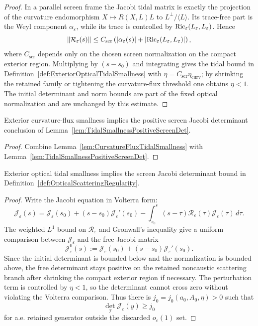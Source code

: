 \begin{proof}
In a parallel screen frame the Jacobi tidal matrix is exactly the projection of the curvature endomorphism $X\mapsto R(X,L)L$ to $L^\perp/\langle L\rangle$. Its trace-free part is the Weyl component $\alpha_\varepsilon$, while its trace is controlled by $\mathrm{Ric}_\varepsilon(L_\varepsilon,L_\varepsilon)$. Hence
\[
    \|\mathcal R_\varepsilon(s)\|
    \le C_{\mathrm{scr}}
    \left(
        |\alpha_\varepsilon(s)|
        +|\mathrm{Ric}_\varepsilon(L_\varepsilon,L_\varepsilon)|
    \right),
\]
where $C_{\mathrm{scr}}$ depends only on the chosen screen normalization on the compact exterior region. Multiplying by $(s-s_0)$ and integrating gives the tidal bound in Definition~\ref{def:ExteriorOpticalTidalSmallness} with $\eta=C_{\mathrm{scr}}\eta_{\mathrm{curv}}$; by shrinking the retained family or tightening the curvature-flux threshold one obtains $\eta<1$. The initial determinant and norm bounds are part of the fixed optical normalization and are unchanged by this estimate.
\end{proof}

\begin{corollary}\label{cor:CurvatureFluxPositiveScreenDet}
Exterior curvature-flux smallness implies the positive screen Jacobi determinant conclusion of Lemma~\ref{lem:TidalSmallnessPositiveScreenDet}.
\end{corollary}

\begin{proof}
Combine Lemma~\ref{lem:CurvatureFluxTidalSmallness} with Lemma~\ref{lem:TidalSmallnessPositiveScreenDet}.
\end{proof}

\begin{lemma}\label{lem:TidalSmallnessPositiveScreenDet}
Exterior optical tidal smallness implies the screen Jacobi determinant bound in Definition~\ref{def:OpticalScatteringRegularity}.
\end{lemma}

\begin{proof}
Write the Jacobi equation in Volterra form:
\[
    \mathcal J_\varepsilon(s)
    =
    \mathcal J_\varepsilon(s_0)
    +(s-s_0)\mathcal J_\varepsilon'(s_0)
    -
    \int_{s_0}^{s}(s-\tau)\mathcal R_\varepsilon(\tau)\mathcal J_\varepsilon(\tau)\,d\tau .
\]
The weighted $L^1$ bound on $\mathcal R_\varepsilon$ and Gronwall's inequality give a uniform comparison between $\mathcal J_\varepsilon$ and the free Jacobi matrix
\[
    \mathcal J_\varepsilon^{0}(s)
    :=
    \mathcal J_\varepsilon(s_0)+(s-s_0)\mathcal J_\varepsilon'(s_0).
\]
Since the initial determinant is bounded below and the normalization is bounded above, the free determinant stays positive on the retained noncaustic scattering branch after shrinking the compact exterior region if necessary. The perturbation term is controlled by $\eta<1$, so the determinant cannot cross zero without violating the Volterra comparison. Thus there is $j_0=j_0(a_0,A_0,\eta)>0$ such that
\[
    \det_{\mathscr I}\mathcal J_\varepsilon(y)\ge j_0
\]
for a.e. retained generator outside the discarded $o_\varepsilon(1)$ set.
\end{proof}

